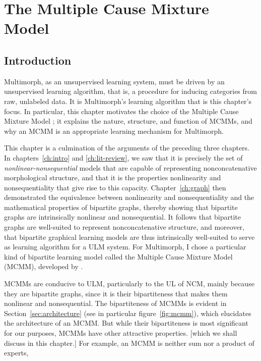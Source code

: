 \chapter{The Multiple Cause Mixture Model}
\label{ch:MCMM}

\section{Introduction}
\label{sec:mcmm:intro}
Multimorph, as an unsupervised learning system, must be 
driven by an unsupervised learning algorithm, that is, 
a procedure for inducing categories from raw, unlabeled data.
It is Multimorph's learning algorithm that is this chapter's focus. In particular, this chapter motivates the choice of the Multiple Cause Mixture Model \citep{saund:94}; it explains the nature, structure, and function of MCMMs, and why an MCMM is an appropriate learning mechanism for Multimorph. 

This chapter is a culmination of the arguments of the preceding three chapters. 
In chapters~\ref{ch:intro} and \ref{ch:lit-review}, we saw that it is precisely 
the set of \emph{nonlinear-nonsequential} models that are capable of representing 
nonconcatenative morphological structure, and that it is the properties nonlinearity 
and nonsequentiality that give rise to this capacity.
Chapter~\ref{ch:graph} then 
demonstrated the equivalence between nonlinearity and 
nonsequentiality and the mathematical properties of 
bipartite graphs, thereby showing that bipartite graphs are 
intrinsically nonlinear and nonsequential. It follows that bipartite graphs are 
well-suited to represent nonconcatenative structure, and moreover, that bipartite graphical learning models are thus intrinsically well-suited to serve as learning algorithm for a ULM system. For Multimorph, I chose a particular kind of bipartite learning model called the Multiple Cause Mixture Model (MCMM), developed by \citet{saund:1994}.

MCMMs are conducive to ULM, particularly to the UL of NCM, mainly because they are bipartite graphs, since it is their bipartiteness that makes them nonlinear and nonsequential. The bipartiteness of MCMMs is evident in Section~\ref{sec:architecture} (see in particular figure~\ref{fig:mcmm}), which elucidates the architecture
of an MCMM. But while their bipartiteness is most significant for our purposes, MCMMs have other attractive properties. [which we shall discuss in this chapter.] For example, an MCMM is neither sum nor a product of experts, 

